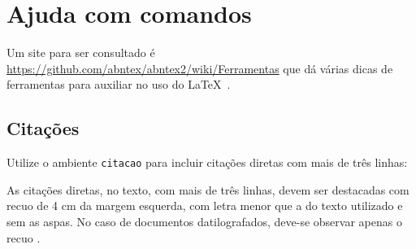  
% 
% 
% 
 
 
\chapter{Ajuda com comandos}\label{cap_ajuda}


\vspace{10pt}
Um site para ser consultado é \newline \url{https://github.com/abntex/abntex2/wiki/Ferramentas} \newline que dá várias dicas de ferramentas para auxiliar no uso do \LaTeX~. 

\section{Citações}

Utilize o ambiente \texttt{citacao} para incluir citações diretas com mais de três linhas:

\begin{citacao}
As citações diretas, no texto, com mais de três linhas, devem ser
destacadas com recuo de 4 cm da margem esquerda, com letra menor que a do texto
utilizado e sem as aspas. No caso de documentos datilografados, deve-se
observar apenas o recuo \cite[5.3]{NBR10520:2002}.
\end{citacao}

